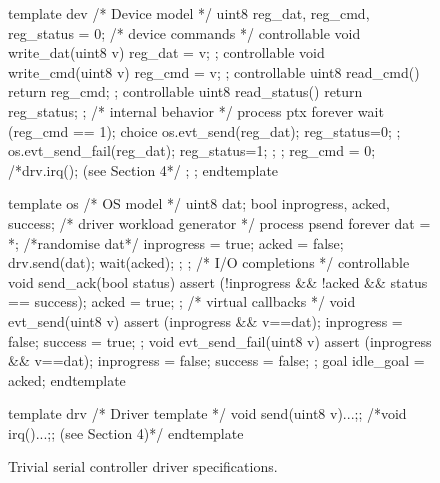 


\begin{figure}
\lstset{numbers=left}
\lstset{firstnumber=last}
    \scriptsize
\begin{tsllisting}[name=ex]
template dev /* Device model */
  uint8 reg_dat, reg_cmd, reg_status = 0;
  /* device commands */
  controllable void write_dat(uint8 v) 
  { reg_dat = v; };
  controllable void write_cmd(uint8 v) 
  { reg_cmd = v; };
  controllable uint8 read_cmd() 
  { return reg_cmd; };
  controllable uint8 read_status() 
  { return reg_status; };
  /* internal behavior */
  process ptx {
    forever {
      wait (reg_cmd == 1);
      choice {
        { os.evt_send(reg_dat);
          reg_status=0; };
        { os.evt_send_fail(reg_dat);
          reg_status=1; };
      };
      reg_cmd = 0;
      /*drv.irq(); (see Section 4*/
    };
  };
endtemplate

template os /* OS model */
  uint8 dat;
  bool inprogress, acked, success;
  /* driver workload generator */
  process psend {
    forever {
      dat = *; /*randomise dat*/
      inprogress = true;
      acked = false;
      drv.send(dat);
      wait(acked);
    };
  };
  /* I/O completions */
  controllable void send_ack(bool status) {
    assert (!inprogress && !acked && 
            status == success);
    acked = true;
  };
  /* virtual callbacks */
  void evt_send(uint8 v) {
    assert (inprogress && v==dat);
    inprogress = false;
    success = true;
  };
  void evt_send_fail(uint8 v) {
    assert (inprogress && v==dat);
    inprogress = false;
    success = false;
  };
  goal idle_goal = acked;
endtemplate

template drv /* Driver template */
  void send(uint8 v){...;};
  /*void irq(){...;}; (see Section 4)*/
endtemplate
\end{tsllisting}
    \caption{\small Trivial serial controller driver specifications.}
    \label{f:ex}
\end{figure}

